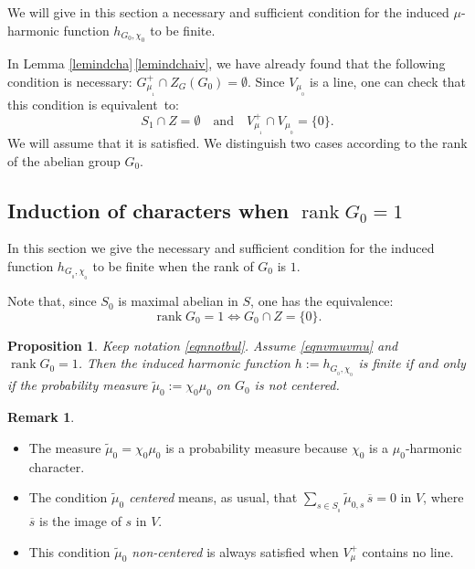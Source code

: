 \documentclass[11pt]{article}
\newcommand{\skpt}{\smallskip}
\numberwithin{equation}{section}
\DeclareMathOperator{\rank}{rank}
\newtheorem{Prop}[Thm]{Proposition}
\theoremstyle{definition}
\newtheorem{Rem}[Thm]{Remark}
\let\ol\overline
\let\bq\relax
\let\eq\relax
\begin{document}
We will give in this section a
necessary and sufficient condition
for the induced $\mu$-harmonic function $h_{G_0,\chi_0}$
to be finite.

In Lemma \ref{lemindcha}\,\eqref{lemindchaiv}, we have already found that the following condition
is necessary: $G_{\mu_{_1}}^+\cap Z_G(G_0)=\emptyset$.
Since $V_{\mu_{_0}}$ is a line, one can check that this condition is equivalent~to:
\begin{equation}
\label{eqnvmuvmu}
S_1\cap Z=\emptyset
\quad\text{and}\quad
V^+_{\mu_{_1}}\cap V_{\mu_{_0}}=\{0\}.
\end{equation}
We will assume that it is satisfied. We distinguish two cases according to the rank of the abelian group $G_0$.

\subsection{Induction of characters when $\rank G_0=1$}
\label{secindhar1}
\bq
In this section we give the necessary and sufficient condition for
the induced function $h_{G_{_0},\chi_{_0}}$ to be finite when the rank of $G_0$ is $1$.
\eq

Note that, since $S_0$ is maximal abelian in $S$,
one has the equivalence:
\[
\rank G_0=1\Longleftrightarrow G_0\cap Z=\{0\}.
\]

\begin{Prop}
\label{proindra1}
Keep notation \eqref{eqnnotbul}. Assume \eqref{eqnvmuvmu} and $\rank G_0=1$.
Then the induced harmonic function $h:=h_{G_{_0},\chi_{_0}}$ is finite if and only if
the probability measure $\widetilde{\mu}_0:=\chi_0\mu_0$ on $G_0$ is not centered.
\end{Prop}

\skpt
\begin{Rem}
\begin{itemize}
\item
The measure $\widetilde{\mu}_0=\chi_0\mu_0$ is a probability measure because
$\chi_0$ is a $\mu_0$-harmonic character.
\item
The condition {\it $\widetilde{\mu}_0$ centered} means, as usual, that
$\sum_{s\in S_{_0}}\widetilde{\mu}_{0,s}\, \ol s =0$ in $V$,
where $\ol{s}$ is the image of $s$ in $V$.
\item
This condition {\it $\widetilde{\mu}_0$ non-centered} is always satisfied
when $V_\mu^+$ contains no line.
\end{itemize}
\end{Rem}
\end{document}
